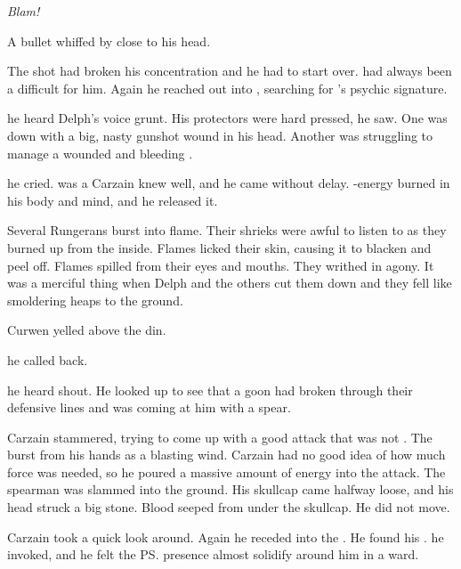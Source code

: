 \emph{Blam!}

A bullet whiffed by close to his head. 

The shot had broken his concentration and he had to start over. 
\Hoshied{} had always been a difficult \sephirah{} for him. 
Again he reached out into \Iquin, searching for \Hoshied's psychic signature. 

 he heard Delph's voice grunt. 
His protectors were hard pressed, he saw. 
One was down with a big, nasty gunshot wound in his head. 
Another was struggling to manage a wounded and bleeding \relc. 


 he cried. 
\Izion{} was a \sephirah{} Carzain knew well, and he came without delay. 
\Iquin-energy burned in his body and mind, and he released it. 

Several Rungerans burst into flame. 
Their shrieks were awful to listen to as they burned up from the inside. 
Flames licked their skin, causing it to blacken and peel off. 
Flames spilled from their eyes and mouths. 
They writhed in agony. 
It was a merciful thing when Delph and the others cut them down and they fell like smoldering heaps to the ground. 


\ta{\Shireyo!} Curwen yelled above the din. 

 he called back. 

 he heard \Tsekkect{} shout. 
He looked up to see that a goon had broken through their defensive lines and was coming at him with a spear. 

Carzain stammered, trying to come up with a good attack \Archon{} that was not \Izion. 
The \sephirah{} burst from his hands as a blasting wind. 
Carzain had no good idea of how much force was needed, so he poured a massive amount of energy into the attack. 
The spearman was slammed into the ground. 
His skullcap came halfway loose, and his head struck a big stone. 
Blood seeped from under the skullcap. 
He did not move. 

Carzain took a quick look around. 
Again he receded into the . 
He found his \sephirah. 
\ta{\Hoshied!} he invoked, and he felt the \ps{\sephirah} presence almost solidify around him in a ward. 

